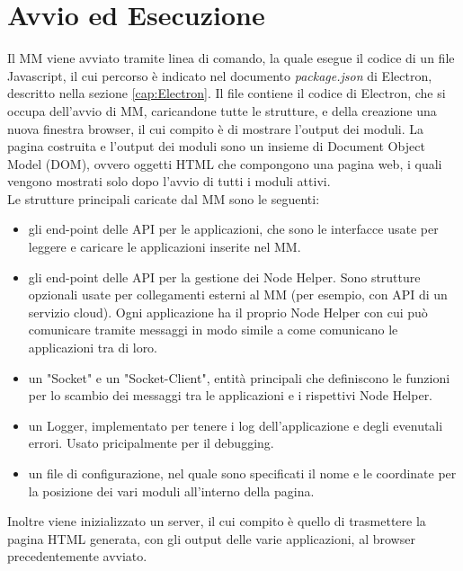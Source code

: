 \section{Avvio ed Esecuzione}\label{cap:MMavvio}
Il MM viene avviato tramite linea di comando, la quale esegue
il codice di un file Javascript, il cui percorso \`e indicato nel documento \textit{package.json} di Electron, descritto nella sezione \ref{cap:Electron}.
Il file contiene il codice di Electron, che si occupa dell'avvio di MM, caricandone tutte le strutture, e della creazione una nuova finestra browser,
il cui compito \`e di mostrare l'output dei moduli.
La pagina costruita e l'output dei moduli sono un insieme di Document Object Model (DOM), ovvero oggetti HTML che compongono una pagina web,
i quali vengono mostrati
solo dopo l'avvio di tutti i moduli attivi.\\
Le strutture principali caricate dal MM sono le seguenti:
\begin{itemize}
\item gli end-point delle API per le applicazioni, che sono le interfacce usate per leggere e caricare le applicazioni inserite nel MM.
\item gli end-point delle API per la gestione dei Node Helper. Sono strutture opzionali usate per collegamenti
esterni al MM (per esempio, con API di un servizio cloud). Ogni applicazione ha il proprio Node Helper con cui pu\`o comunicare tramite messaggi in modo
simile a come comunicano le applicazioni tra di loro.
\item un "Socket" e un "Socket-Client", entit\`a principali che definiscono le funzioni per lo scambio dei messaggi tra le applicazioni e i
rispettivi Node Helper.
\item un Logger, implementato per tenere i log dell'applicazione e degli evenutali errori. Usato pricipalmente per il debugging.
\item un file di configurazione, nel quale sono specificati il nome e le coordinate per la posizione dei vari moduli
all'interno della pagina.\\[2\baselineskip]
\end{itemize}
Inoltre viene inizializzato un server, il cui compito \`e quello di trasmettere la pagina HTML generata, con gli output delle varie applicazioni,
al browser precedentemente avviato.

